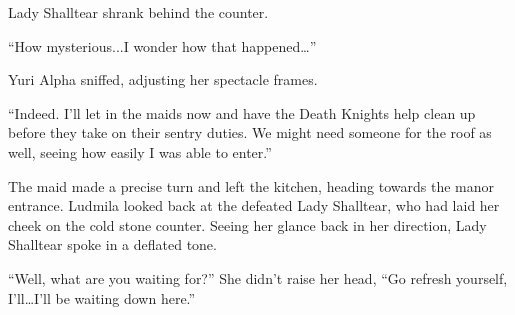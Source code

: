  

Lady Shalltear shrank behind the counter.

 

“How mysterious...I wonder how that happened…”

 

Yuri Alpha sniffed, adjusting her spectacle frames.

 

“Indeed. I’ll let in the maids now and have the Death Knights help clean up before they take on their sentry duties. We might need someone for the roof as well, seeing how easily I was able to enter.”

 

The maid made a precise turn and left the kitchen, heading towards the manor entrance. Ludmila looked back at the defeated Lady Shalltear, who had laid her cheek on the cold stone counter. Seeing her glance back in her direction, Lady Shalltear spoke in a deflated tone.

 

“Well, what are you waiting for?” She didn’t raise her head, “Go refresh yourself, I’ll…I’ll be waiting down here.”